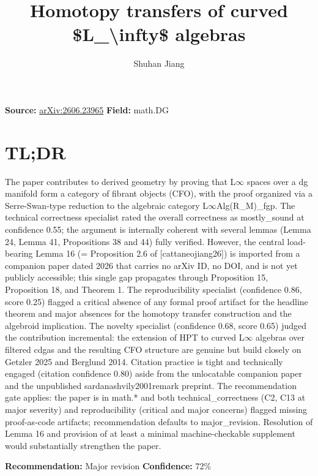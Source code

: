 \documentclass[11pt]{article}
\title{Homotopy transfers of curved \$L\_\textbackslash{}infty\$ algebras}
\author{Shuhan Jiang}
\date{}
\begin{document}
\maketitle

\noindent\textbf{Source:} \href{https://arxiv.org/abs/2606.23965}{arXiv:2606.23965} \quad \textbf{Field:} math.DG\\

\section*{TL;DR}
The paper contributes to derived geometry by proving that L\ensuremath{\infty} spaces over a dg manifold form a category of fibrant objects (CFO), with the proof organized via a Serre-Swan-type reduction to the algebraic category L\ensuremath{\infty}Alg(R\_M)\_fgp. The technical correctness specialist rated the overall correctness as mostly\_sound at confidence 0.55; the argument is internally coherent with several lemmas (Lemma 24, Lemma 41, Propositions 38 and 44) fully verified. However, the central load-bearing Lemma 16 (= Proposition 2.6 of [cattaneojiang26]) is imported from a companion paper dated 2026 that carries no arXiv ID, no DOI, and is not yet publicly accessible; this single gap propagates through Proposition 15, Proposition 18, and Theorem 1. The reproducibility specialist (confidence 0.86, score 0.25) flagged a critical absence of any formal proof artifact for the headline theorem and major absences for the homotopy transfer construction and the algebroid implication. The novelty specialist (confidence 0.68, score 0.65) judged the contribution incremental: the extension of HPT to curved L\ensuremath{\infty} algebras over filtered cdgas and the resulting CFO structure are genuine but build closely on Getzler 2025 and Berglund 2014. Citation practice is tight and technically engaged (citation confidence 0.80) aside from the unlocatable companion paper and the unpublished sardanashvily2001remark preprint. The recommendation gate applies: the paper is in math.* and both technical\_correctness (C2, C13 at major severity) and reproducibility (critical and major concerns) flagged missing proof-as-code artifacts; recommendation defaults to major\_revision. Resolution of Lemma 16 and provision of at least a minimal machine-checkable supplement would substantially strengthen the paper.

\textbf{Recommendation:} Major revision \quad \textbf{Confidence:} 72\%\\
\end{document}
